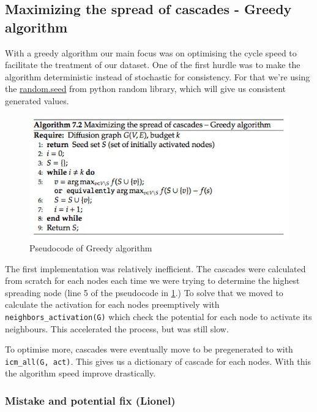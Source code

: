 \subsection{Maximizing the spread of cascades - Greedy algorithm}

With a greedy algorithm our main focus was on optimising the cycle speed to facilitate the treatment of our dataset.
One of the first hurdle was to make the algorithm deterministic instead of stochastic for consistency. For that we're using the \href{https://docs.python.org/3.8/library/random.html#random.seed}{random.seed} from python random library, which will give us consistent generated values.

\begin{figure}[H]
    \centering
    \includegraphics[width=0.8\linewidth]{Report/images/greedy_pseudo.png}
    \caption{Pseudocode of Greedy algorithm}
    \label{fig:greedy_pseudo}
\end{figure}

The first implementation was relatively inefficient. The cascades were calculated from scratch for each nodes each time we were trying to determine the highest spreading node (line 5 of the pseudocode in \ref{fig:greedy_pseudo}.)
To solve that we moved to calculate the activation for each nodes preemptively with \texttt{neighbors\_activation(G)} which check the potential for each node to activate its neighbours.
This accelerated the process, but was still slow. 

To optimise more, cascades were eventually move to be pregenerated to with \texttt{icm\_all(G, act)}. This gives us a dictionary of cascade for each nodes. With this the algorithm speed improve drastically.



\subsubsection*{Mistake and potential fix (Lionel)}

